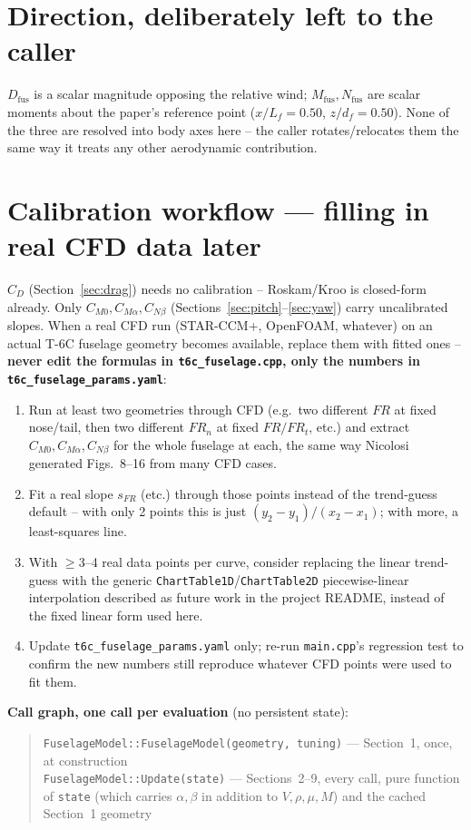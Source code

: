 \documentclass[11pt]{article}
\begin{document}
\section{Direction, deliberately left to the caller}
$D_{\text{fus}}$ is a scalar magnitude opposing the relative wind;
$M_{\text{fus}},N_{\text{fus}}$ are scalar moments about the paper's
reference point ($x/L_f{=}0.50$, $z/d_f{=}0.50$). None of the three are
resolved into body axes here -- the caller rotates/relocates them the
same way it treats any other aerodynamic contribution.

\section{Calibration workflow --- filling in real CFD data later}
\label{sec:calibration}

$C_D$ (Section~\ref{sec:drag}) needs no calibration -- Roskam/Kroo is
closed-form already. Only $C_{M0},C_{M\alpha},C_{N\beta}$
(Sections~\ref{sec:pitch}--\ref{sec:yaw}) carry uncalibrated slopes.
When a real CFD run (STAR-CCM+, OpenFOAM, whatever) on an actual T-6C
fuselage geometry becomes available, replace them with fitted ones --
\textbf{never edit the formulas in \texttt{t6c\_fuselage.cpp}, only the
numbers in \texttt{t6c\_fuselage\_params.yaml}}:

\begin{enumerate}[nosep]
\item Run at least two geometries through CFD (e.g.\ two different $FR$
at fixed nose/tail, then two different $FR_n$ at fixed $FR/FR_t$, etc.)
and extract $C_{M0},C_{M\alpha},C_{N\beta}$ for the whole fuselage at
each, the same way Nicolosi generated Figs.~8--16 from many CFD cases.
\item Fit a real slope $s_{FR}$ (etc.) through those points instead of
the trend-guess default -- with only 2 points this is just
$(y_2-y_1)/(x_2-x_1)$; with more, a least-squares line.
\item With $\geq3$--4 real data points per curve, consider replacing
the linear trend-guess with the generic
\texttt{ChartTable1D}/\texttt{ChartTable2D} piecewise-linear
interpolation described as future work in the project README, instead
of the fixed linear form used here.
\item Update \texttt{t6c\_fuselage\_params.yaml} only; re-run
\texttt{main.cpp}'s regression test to confirm the new numbers still
reproduce whatever CFD points were used to fit them.
\end{enumerate}

\bigskip
\noindent\textbf{Call graph, one call per evaluation} (no persistent
state):
\begin{quote}
\texttt{FuselageModel::FuselageModel(geometry, tuning)} --- Section~1,
once, at construction\\
\texttt{FuselageModel::Update(state)} --- Sections~2--9, every call,
pure function of \texttt{state} (which carries $\alpha,\beta$ in
addition to $V,\rho,\mu,M$) and the cached Section~1 geometry
\end{quote}
\end{document}
